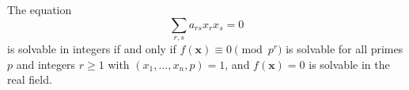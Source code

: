 \begin{proposition}
    The equation
\[
    \sum_{r,s}a_{rs}x_rx_s=0
\]
    is solvable in integers if and only if $f(\mathbf{x})\equiv0\pmod{p^r}$ is solvable for all primes $p$ and integers $r\ge1$ with $(x_1,\ldots,x_n,p)=1$, and $f(\mathbf{x})=0$ is solvable in the real field.
\end{proposition}
